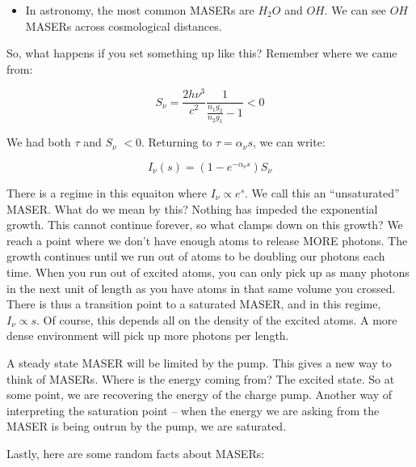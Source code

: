 \documentclass{article}
\newcommand{\be}{\begin{equation}}
\newcommand{\ee}{\end{equation}}
\begin{document}
\begin{itemize}
    \item In astronomy, the most common MASERs are $H_2 O$ and $OH$. We can see $OH$ MASERs across cosmological distances. 
\end{itemize}

So, what happens if you set something up like this? Remember where we came from:

\be
S_\nu = \frac{2h\nu^3}{c^2}\frac{1}{\frac{n_1 g_2}{n_2 g_1} - 1}< 0
\ee

We had both $\tau$ and $S_\nu$ $<0$. Returning to $\tau = \alpha_\nu s$, we can write:

\be
I_\nu (s) = \left(1 - e^{-\alpha_\nu s}\right) S_\nu
\ee

There is a regime in this equaiton where $I_\nu \propto e^{s}$. We call this an ``unsaturated'' MASER. What do we mean by this? Nothing has impeded the exponential growth. This cannot continue forever, so what clamps down on this growth? We reach a point where we don't have enough atoms to release MORE photons. The growth continues until we run out of atoms to be doubling our photons each time. When you run out of excited atoms, you can only pick up as many photons in the next unit of length as you have atoms in that same volume you crossed. There is thus a transition point to a saturated MASER, and in this regime, $I_\nu \propto s$. Of course, this depends all on the density of the excited atoms. A more dense environment will pick up more photons per length.

A steady state MASER will be limited by the pump. This gives a new way to think of MASERs. Where is the energy coming from? The excited state. So at some point, we are recovering the energy of the charge pump. Another way of interpreting the saturation point -- when the energy we are asking from the MASER is being outrun by the pump, we are saturated. 

Lastly, here are some random facts about MASERs:
\end{document}
